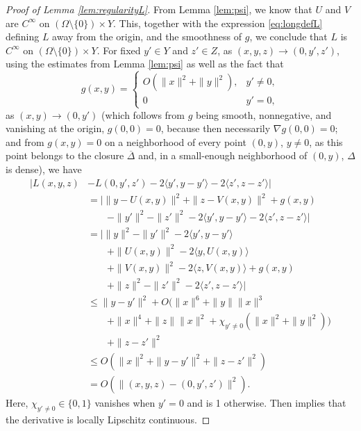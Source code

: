 \documentclass{article}
\theoremstyle{definition}
\theoremstyle{remark}
\begin{document}
\begin{proof}[Proof of Lemma \ref{lem:regularityL}]
From Lemma \ref{lem:psi}, we know that $U$ and $V$ are $C^\infty$ on $(\Omega\setminus\{0\})\times Y$.
%
This, together with the expression \eqref{eq:longdefL} defining $L$ away from the origin, and the smoothness of $g$, we conclude that $L$ is $C^\infty$ on $(\Omega\setminus\{0\})\times Y$. 
%
For fixed $y'\in Y$ and $z'\in Z$, as $(x,y,z)\to(0,y',z')$, using the estimates from Lemma \ref{lem:psi} as well as the fact that 
\[g(x,y)=\begin{cases}O(\|x\|^2+\|y\|^2),& y'\neq 0,\\
0&y'=0,\end{cases}\] 
as $(x,y)\to(0,y')$ (which follows from $g$ being smooth, nonnegative, and vanishing at the origin, $g(0,0)=0$, because then necessarily $\nabla g(0,0)=0$; and from $g(x,y)=0$ on a neighborhood of every point $(0,y)$, $y\neq 0$, as this point belongs to the closure $ \overline\Delta$ and, in a small-enough neighborhood of $(0,y)$, $\Delta$ is dense), we have
%
%
%
%
%
%
%
%
%
%
%
%
%
\begin{align*}
  |L(x,y,z)&-L(0,y',z')-2\langle y',y-y' \rangle-2\langle z',z-z' \rangle|  \\
  &=|\|y-U(x,y)\|^2+\|z-V(x,y)\|^2+g(x,y)\\
  &\qquad -\|y'\|^2-\|z'\|^2-2\langle y',y-y' \rangle-2\langle z',z-z'\rangle|\\
  &= |\|y\|^2-\|y'\|^2-2\langle y',y-y' \rangle\\
  &\qquad+\|U(x,y)\|^2-2\langle y,U(x,y)\rangle\\
  &\qquad +\|V(x,y)\|^2-2\langle z, V(x,y)\rangle+g(x,y)\\
  &\qquad +\|z\|^2-\|z'\|^2-2\langle z',z-z'\rangle|\\
  &\leq \|y-y'\|^2%
  +O(\|x\|^6+\|y\|\|x\|^3\\
  &\qquad +\|x\|^4+\|z\|\|x\|^2+\chi_{y'\neq0}(\|x\|^2+ \|y\|^2))\\
  &\qquad +\|z-z'\|^2\\
  &\leq O(\|x\|^2+\|y-y'\|^2+\|z-z'\|^2)\\
  &= O(\|(x,y,z)-(0,y',z')\|^2).
\end{align*}
Here, $\chi_{y'\neq 0}\in\{0,1\}$ vanishes when $y'=0$ and is 1 otherwise.
%
%
%
%
%
%
%
%
%
%
%
%
%
%
%
%
%
%
%
%
%
%
Then \cite[Proposition 4.11.3]{fathi2008weak} implies that the derivative is locally Lipschitz continuous.
\end{proof}
\end{document}
